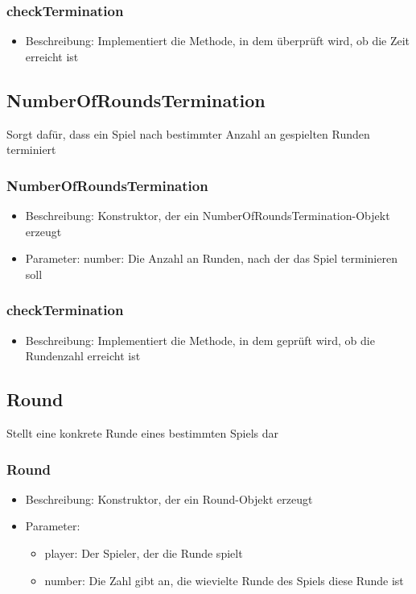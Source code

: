 \documentclass[a4paper]{scrreprt}
\begin{document}
	\subsubsection{checkTermination}
	\begin{itemize}
		\item Beschreibung: Implementiert die Methode, in dem überprüft wird, ob die Zeit erreicht ist
	\end{itemize}

	\subsection{NumberOfRoundsTermination}
	Sorgt dafür, dass ein Spiel nach bestimmter Anzahl an gespielten Runden terminiert
	\subsubsection{NumberOfRoundsTermination}
		\begin{itemize}
		\item Beschreibung: Konstruktor, der ein NumberOfRoundsTermination-Objekt erzeugt
		\item Parameter: number: Die Anzahl an Runden, nach der das Spiel terminieren soll
		\end{itemize}
	\subsubsection{checkTermination}
	\begin{itemize}
		\item Beschreibung: Implementiert die Methode, in dem geprüft wird, ob die Rundenzahl erreicht ist
	\end{itemize}

	\subsection{Round}
	Stellt eine konkrete Runde eines bestimmten Spiels dar
	\subsubsection{Round}
		\begin{itemize}
		\item Beschreibung: Konstruktor, der ein Round-Objekt erzeugt
		\item Parameter:
		\begin{itemize}
		\item player: Der Spieler, der die Runde spielt
		\item number: Die Zahl gibt an, die wievielte Runde des Spiels diese Runde ist
		\end{itemize}
		\end{itemize}
\end{document}
